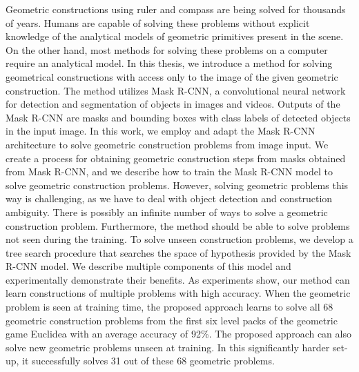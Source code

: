 \documentclass[12pt]{report}
\def\Abstract{
Geometric constructions using ruler and compass are being solved for thousands of years. Humans are capable of solving these problems without explicit knowledge of the analytical models of geometric primitives present in the scene. On the other hand, most methods for solving these problems on a computer require an analytical model. In this thesis, we introduce a method for solving geometrical constructions with access only to the image of the given geometric construction. The method utilizes Mask {R-CNN}, a convolutional neural network for detection and segmentation of objects in images and videos. Outputs of the Mask {R-CNN} are masks and bounding boxes with class labels of detected objects in the input image. In this work, we employ and adapt the Mask R-CNN architecture to solve geometric construction problems from image input. We create a process for obtaining geometric construction steps from masks obtained from Mask R-CNN, and we describe how to train the Mask R-CNN model to solve geometric construction problems. However, solving geometric problems this way is challenging, as we have to deal with object detection and construction ambiguity. There is possibly an infinite number of ways to solve a geometric construction problem. Furthermore, the method should be able to solve problems not seen during the training. 
To solve unseen construction problems, we develop a tree search procedure that searches the space of hypothesis provided by the Mask {R-CNN} model. We describe multiple components of this model and experimentally demonstrate their benefits. As experiments show, our method can learn constructions of multiple problems with high accuracy. When the geometric problem is seen at training time, the proposed approach learns to solve all 68 geometric construction problems from the first six level packs of the geometric game Euclidea with an average accuracy of 92\%. The proposed approach can also solve new geometric problems unseen at training. In this significantly harder set-up, it successfully solves 31 out of these 68 geometric problems.
}
\begin{document}
\Abstract
\end{document}
